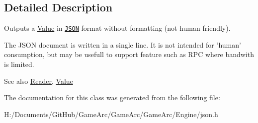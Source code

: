 \subsection{Detailed Description}
Outputs a \hyperlink{class_json_1_1_value}{Value} in \href{http://www.json.org}{\tt J\+S\+O\+N} format without formatting (not human friendly). 

The J\+S\+O\+N document is written in a single line. It is not intended for 'human' consumption, but may be usefull to support feature such as R\+P\+C where bandwith is limited. \begin{DoxySeeAlso}{See also}
\hyperlink{class_json_1_1_reader}{Reader}, \hyperlink{class_json_1_1_value}{Value} 
\end{DoxySeeAlso}


The documentation for this class was generated from the following file\+:\begin{DoxyCompactItemize}
\item 
H\+:/\+Documents/\+Git\+Hub/\+Game\+Arc/\+Game\+Arc/\+Game\+Arc/\+Engine/json.\+h\end{DoxyCompactItemize}

